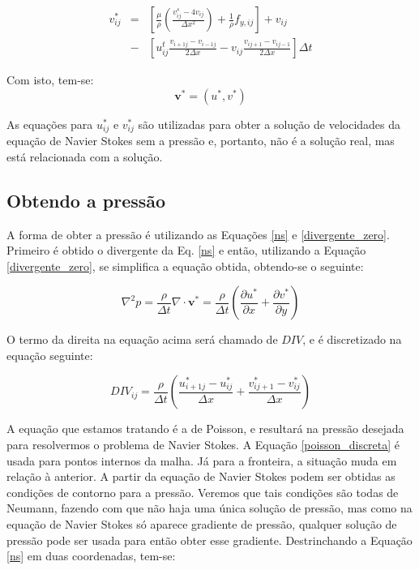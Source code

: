\documentclass[journal]{IEEEtran}
\begin{document}
\begin{eqnarray}
v_{ij}^{*}&=&\left[\frac{\mu}{\rho}\left(\frac{v_{ij}^s-4v_{ij}}{\Delta
x^2}\right)+\frac{1}{\rho}f_{y,ij}\right] + v_{ij}\nonumber \\
&-&\left[u_{ij}^t\frac{v_{i+1j}-v_{i-1j}}{2\Delta
x}-v_{ij}\frac{v_{ij+1}-v_{ij-1}}{2\Delta x}\right]\Delta t
\end{eqnarray}

Com isto, tem-se:
\[\textbf{v}^{*}=(u^*,v^*)\]

As equações para $u_{ij}^{*}$ e $v_{ij}^{*}$ são utilizadas para obter a solução de velocidades da equação de Navier Stokes sem a pressão e, portanto, não é a solução real, mas está relacionada com a solução.

\subsection{Obtendo a pressão}
A forma de obter a pressão é utilizando as Equações \ref{ns} e \ref{divergente_zero}. Primeiro é obtido o divergente da Eq. \ref{ns} e então, utilizando a Equação \ref{divergente_zero}, se simplifica a equação obtida, obtendo-se o seguinte:

\begin{equation}
\nabla^2 p = \frac{\rho}{\Delta t} \nabla\cdot \textbf{v}^*=\frac{\rho}{\Delta t} 
\left( \frac{\partial u^*}{\partial x}+\frac{\partial v^*}{\partial y} \right) \label{poisson_ns}
\end{equation}

O termo da direita na equação acima será chamado de $DIV$, e é discretizado na equação seguinte:

\begin{equation}
DIV_{ij}=\frac{\rho}{\Delta t}\left( \frac{u_{i+1j}^*-u_{ij}^*}{\Delta x}+\frac{v_{ij+1}^*-v_{ij}^*}{\Delta x}\right)
\end{equation}

A equação que estamos tratando é a de Poisson, e resultará na pressão desejada para resolvermos o problema de Navier Stokes. A Equação \ref{poisson_discreta} é usada para pontos internos da malha. Já para a fronteira, a situação muda em relação à anterior. A partir da equação de Navier Stokes podem ser obtidas as condições de contorno para a pressão. Veremos que tais condições são todas de Neumann, fazendo com que não haja uma única solução de pressão, mas como na equação de Navier Stokes só aparece gradiente de pressão, qualquer solução de pressão pode ser usada para então obter esse gradiente. Destrinchando a Equação \ref{ns} em duas coordenadas, tem-se:
\end{document}
